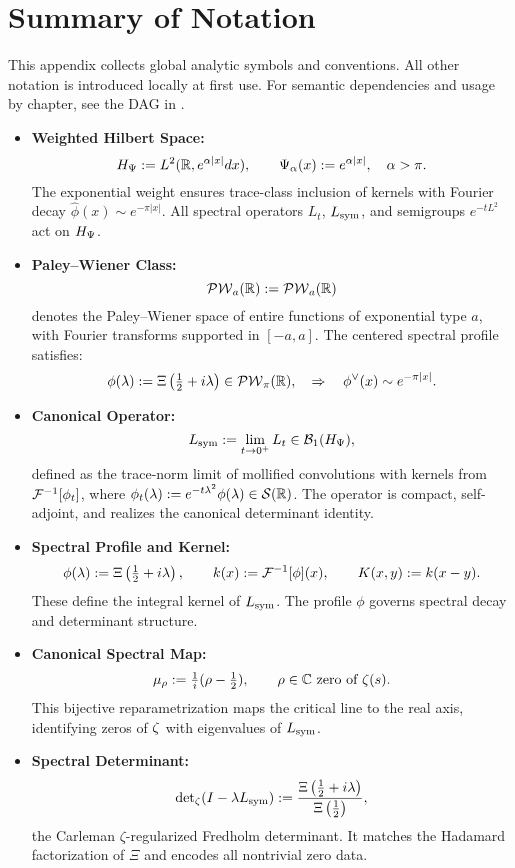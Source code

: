 \section{Summary of Notation}
\label{app:notation_summary}

\noindent
This appendix collects global analytic symbols and conventions. All other notation is introduced locally at first use. For semantic dependencies and usage by chapter, see the DAG in .

\begin{itemize}
  \item \textbf{Weighted Hilbert Space:}
  \[
  H_{\Psi} := L^2(\mathbb{R}, e^{\alpha |x|} dx), \qquad \Psi_\alpha(x) := e^{\alpha |x|}, \quad \alpha > \pi.
  \]
  The exponential weight ensures trace-class inclusion of kernels with Fourier decay \( \widehat{\phi}(x) \sim e^{-\pi |x|} \). All spectral operators \( L_t \), \( L_{\mathrm{sym}} \), and semigroups \( e^{-tL^2} \) act on \( H_{\Psi} \).

  \item \textbf{Paley–Wiener Class:}
  \[
  \mathcal{PW}_{a}(\mathbb{R}) := \mathcal{PW}_a(\mathbb{R})
  \]
  denotes the Paley–Wiener space of entire functions of exponential type \( a \), with Fourier transforms supported in \( [-a, a] \). The centered spectral profile satisfies:
  \[
  \phi(\lambda) := \Xi\left( \tfrac{1}{2} + i\lambda \right) \in \mathcal{PW}_{\pi}(\mathbb{R}), \quad \Rightarrow \quad \phi^\vee(x) \sim e^{-\pi |x|}.
  \]

  \item \textbf{Canonical Operator:}
  \[
  L_{\mathrm{sym}} := \lim_{t \to 0^+} L_t \in \mathcal{B}_1(H_{\Psi}),
  \]
  defined as the trace-norm limit of mollified convolutions with kernels from \( \mathcal{F}^{-1}[\phi_t] \), where \( \phi_t(\lambda) := e^{-t\lambda^2} \phi(\lambda) \in \mathcal{S}(\mathbb{R}) \). The operator is compact, self-adjoint, and realizes the canonical determinant identity.

  \item \textbf{Spectral Profile and Kernel:}
  \[
  \phi(\lambda) := \Xi\left( \tfrac{1}{2} + i\lambda \right), \qquad k(x) := \mathcal{F}^{-1}[\phi](x), \qquad K(x, y) := k(x - y).
  \]
  These define the integral kernel of \( L_{\mathrm{sym}} \). The profile \( \phi \) governs spectral decay and determinant structure.

  \item \textbf{Canonical Spectral Map:}
  \[
  \mu_\rho := \tfrac{1}{i}(\rho - \tfrac{1}{2}), \qquad \rho \in \mathbb{C} \text{ zero of } \zeta(s).
  \]
  This bijective reparametrization maps the critical line to the real axis, identifying zeros of \( \zeta \) with eigenvalues of \( L_{\mathrm{sym}} \).

  \item \textbf{Spectral Determinant:}
  \[
  \det\nolimits_\zeta(I - \lambda L_{\mathrm{sym}}) := \frac{\Xi\left( \tfrac{1}{2} + i\lambda \right)}{\Xi\left( \tfrac{1}{2} \right)},
  \]
  the Carleman \(\zeta\)-regularized Fredholm determinant. It matches the Hadamard factorization of \( \Xi \) and encodes all nontrivial zero data.
\end{itemize}

